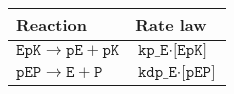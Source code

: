 \begin{tabular}{ll}
\textbf{Reaction} & \textbf{Rate law} \\
\midrule
$ \texttt{EpK}  \rightarrow \texttt{pE}  +  \texttt{pK}  $ & $ \texttt{kp\_E}  \cdot  \texttt{[EpK]}  $ \\
$ \texttt{pEP}  \rightarrow \texttt{E}  +  \texttt{P}  $ & $ \texttt{kdp\_E}  \cdot  \texttt{[pEP]}  $ \\
\end{tabular}